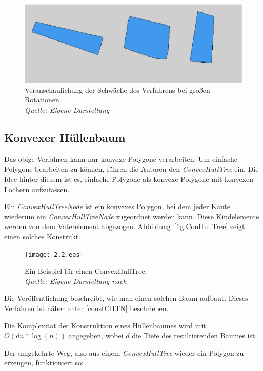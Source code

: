 \begin{figure}
	\centering
	\includegraphics[width=0.9 \textwidth]{Rotation.eps}
	\caption[Veranschaulichung der Schwächen des Verfahrens für große Rotationen]{Veranschaulichung der Schwäche des Verfahrens bei großen Rotationen.\\\textit{Quelle: Eigene Darstellung}}
	\label{fig:BeispielschlechteRot}
\end{figure}

\subsection{Konvexer Hüllenbaum}

Das obige Verfahren kann nur konvexe Polygone verarbeiten. Um einfache Polygone bearbeiten zu können, führen die Autoren den \textit{ConvexHullTree} ein. Die Idee hinter diesem ist es, einfache Polygone als konvexe Polygone mit konvexen Löchern aufzufassen. 

Ein \textit{ConvexHullTreeNode} ist ein konvexes Polygon, bei dem jeder Kante wiederum ein \textit{ConvexHullTreeNode} zugeordnet werden kann. Diese Kindelemente werden von dem Vaterelement abgezogen. Abbildung~\vref{fig:ConHullTree} zeigt einen solches Konstrukt.

\begin{figure}
	\centering
	\texttt{[image: 2.2.eps]}
	\caption[Beispiel für einen ConvexHullTree]{Ein Beispiel für einen ConvexHullTree.\\\textit{Quelle: Eigene Darstellung nach \cite{TG}}}
	\label{fig:ConHullTree}
\end{figure}

Die Veröffentlichung beschreibt, wie man einen solchen Baum aufbaut. Dieses Verfahren ist näher unter \vref{constCHTN} beschrieben.

Die Komplexität der Konstruktion eines Hüllenbaumes wird mit $O(dn*\log(n))$ angegeben, wobei $d$ die Tiefe des resultierenden Baumes ist.

Der umgekehrte Weg, also aus einem \textit{ConvexHullTree} wieder ein Polygon zu erzeugen, funktioniert so:


